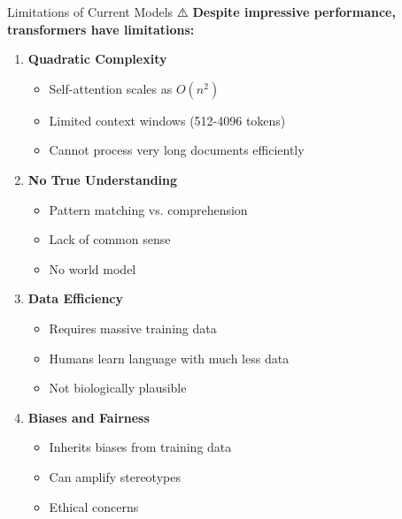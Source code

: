 \documentclass[aspectratio=169]{beamer}
\begin{document}
\begin{frame}[shrink=10]{Limitations of Current Models ⚠️}
\textbf{Despite impressive performance, transformers have limitations:}

\vspace{1em}

\begin{enumerate}\setlength{\itemsep}{0pt}
    \item \textbf{Quadratic Complexity}
    \begin{itemize}\setlength{\itemsep}{0pt}
        \item Self-attention scales as $O(n^2)$
        \item Limited context windows (512-4096 tokens)
        \item Cannot process very long documents efficiently
    \end{itemize}

    \item \textbf{No True Understanding}
    \begin{itemize}\setlength{\itemsep}{0pt}
        \item Pattern matching vs. comprehension
        \item Lack of common sense
        \item No world model
    \end{itemize}

    \item \textbf{Data Efficiency}
    \begin{itemize}\setlength{\itemsep}{0pt}
        \item Requires massive training data
        \item Humans learn language with much less data
        \item Not biologically plausible
    \end{itemize}

    \item \textbf{Biases and Fairness}
    \begin{itemize}\setlength{\itemsep}{0pt}
        \item Inherits biases from training data
        \item Can amplify stereotypes
        \item Ethical concerns
    \end{itemize}
\end{enumerate}
\end{frame}
\end{document}
